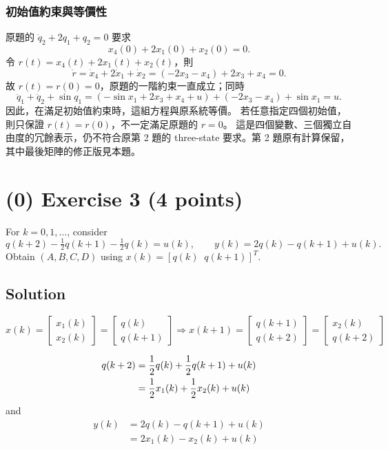\documentclass[12pt,a4paper]{article}
\begin{document}
\subsubsection*{初始值約束與等價性}
原題的 $\dot q_2+2q_1+q_2=0$ 要求
\[
\boxed{x_4(0)+2x_1(0)+x_2(0)=0.}
\]
令 $r(t)=x_4(t)+2x_1(t)+x_2(t)$，則
\[
\dot r=\dot x_4+2\dot x_1+\dot x_2
=(-2x_3-x_4)+2x_3+x_4=0.
\]
故 $r(t)=r(0)=0$，原題的一階約束一直成立；同時
\[
\ddot q_1+\ddot q_2+\sin q_1
=(-\sin x_1+2x_3+x_4+u)+(-2x_3-x_4)+\sin x_1=u.
\]
因此，在滿足初始值約束時，這組方程與原系統等價。
若任意指定四個初始值，則只保證 $r(t)=r(0)$，不一定滿足原題的 $r=0$。
這是四個變數、三個獨立自由度的冗餘表示，仍不符合原第 2 題的
three-state 要求。第 2 題原有計算保留，其中最後矩陣的修正版見本題。

\clearpage
\section*{(0) Exercise 3 \hfill {\normalsize (4 points)}}
For $k=0,1,\ldots$, consider
\[
q(k+2)-\tfrac12q(k+1)-\tfrac12q(k)=u(k),\qquad
y(k)=2q(k)-q(k+1)+u(k).
\]
Obtain $(A,B,C,D)$ using $x(k)=[q(k)\;\;q(k+1)]^T$.
\subsection*{Solution}

\[
x(k)=\begin{bmatrix}
	x_1(k) \\ x_2(k)
\end{bmatrix} = \begin{bmatrix}
	q(k) \\ q(k + 1)
\end{bmatrix} \Rightarrow  x(k + 1) = \begin{bmatrix}
 q(k + 1) \\ q(k + 2)
\end{bmatrix} = \begin{bmatrix}
x_2(k) \\ q(k + 2)
\end{bmatrix}
\]

\begin{align*}
	q(k +2) &= {1\over2 } q(k) + {1\over2 } q(k + 1) + u(k) \\
	&= {1\over 2} x_1(k) + {1\over2 } x_2(k) + u(k)
\end{align*}
and 
\begin{align*}
	y(k) &= 2q(k)- q(k + 1) + u(k) \\
	&= 2x_1(k) - x_2(k) + u(k)
\end{align*}
\end{document}
